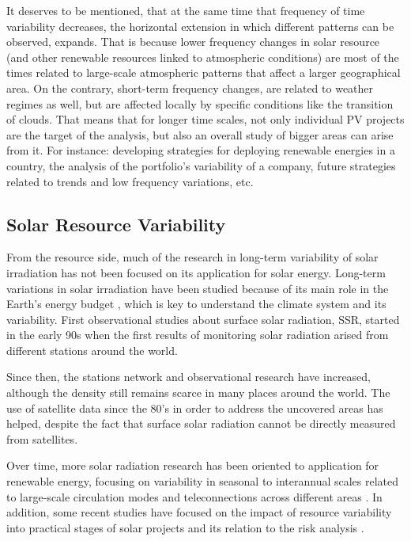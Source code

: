 It deserves to be mentioned, that at the same time that frequency of time variability decreases, the horizontal extension in which different patterns can be observed, expands. That is because lower frequency changes in solar resource (and other renewable resources linked to atmospheric conditions) are most of the times related to large-scale atmospheric patterns that affect a larger geographical area. On the contrary, short-term frequency changes, are related to weather regimes as well, but are affected locally by specific conditions like the transition of clouds. That means that for longer time scales, not only individual PV projects are the target of the analysis, but also an overall study of bigger areas can arise from it. For instance: developing strategies for deploying renewable energies in a country, the analysis of the portfolio's variability of a company, future strategies related to trends and low frequency variations, etc. 
  
\subsection{Solar Resource Variability}

From the resource side, much of the research in long-term variability of solar irradiation has not been focused on its application for solar energy. Long-term variations in solar irradiation have been studied because of its main role in the Earth's energy budget \cite*{Wild2012}, which is key to understand the climate system and its variability. First observational studies about surface solar radiation, SSR, started in the early 90s \cite*{Ohmura, Dutton2006} when the first results of monitoring solar radiation arised from different stations around the world.

Since then, the stations network and observational research have increased, although the density still remains scarce in many places around the world. The use of satellite data since the 80's in order to address the uncovered areas has helped, despite the fact that surface solar radiation cannot be directly measured from satellites.  

Over time, more solar radiation research has been oriented to application for renewable energy, focusing on variability in seasonal to interannual scales related to large-scale circulation modes and teleconnections across different areas \cite*{Davy2012, Jerez2013, Jerez2013a}.  In addition, some recent studies have focused on the impact of resource variability into practical stages of solar projects and its relation to the risk analysis \cite*{Bryce2018}.

